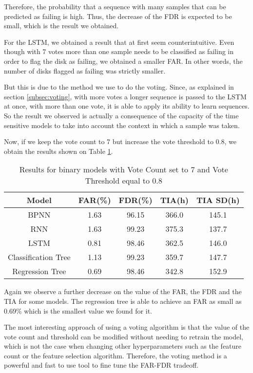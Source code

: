 Therefore, the probability that a sequence with many samples that can be predicted as failing is high.
Thus, the decrease of the FDR is expected to be small, which is the result we obtained.

For the LSTM, we obtained a result that at first seem counterintuitive.
Even though with 7 votes more than one sample needs to be classified as failing in order to flag the disk as failing, we obtained a smaller FAR.
In other words, the number of disks flagged as failing was strictly smaller.

But this is due to the method we use to do the voting.
Since, as explained in section \ref{subsec:voting}, with more votes a longer sequence is passed to the LSTM at once, with more than one vote, it is able to apply its ability to learn sequences.
So the result we observed is actually a consequence of the capacity of the time sensitive models to take into account the context in which a sample was taken.

Now, if we keep the vote count to 7 but increase the vote threshold to 0.8, we obtain the results shown on Table \ref{table:results_binary_threshold}.

\begin{table}
  \begin{center}
    \begin{tabular}{|c|c|c|c|c|}
      \hline
    Model & FAR(\%) & FDR(\%) & TIA(h) & TIA SD(h) \\
    \hline
    BPNN & 1.63 & 96.15 & 366.0 & 145.1 \\
    RNN & 1.63 & 99.23 & 375.3 & 137.7 \\
    LSTM & 0.81 & 98.46 & 362.5 & 146.0 \\
    Classification Tree & 1.13 & 99.23 & 359.7 & 147.7 \\
    Regression Tree & 0.69 & 98.46 & 342.8 & 152.9 \\
    \hline
    \end{tabular}
    \caption[Results Binary Models with Threshold]{Results for binary models with Vote Count set to 7 and Vote Threshold equal to 0.8}
    \label{table:results_binary_threshold}
  \end{center}
\end{table}

Again we observe a further decrease on the value of the FAR, the FDR and the TIA for some models.
The regression tree is able to achieve an FAR as small as 0.69\% which is the smallest value we found for it.

The most interesting approach of using a voting algorithm is that the value of the vote count and threshold can be modified without needing to retrain the model, which is not the case when changing other hyperparameters such as the feature count or the feature selection algorithm.
Therefore, the voting method is a powerful and fast to use tool to fine tune the FAR-FDR tradeoff.

